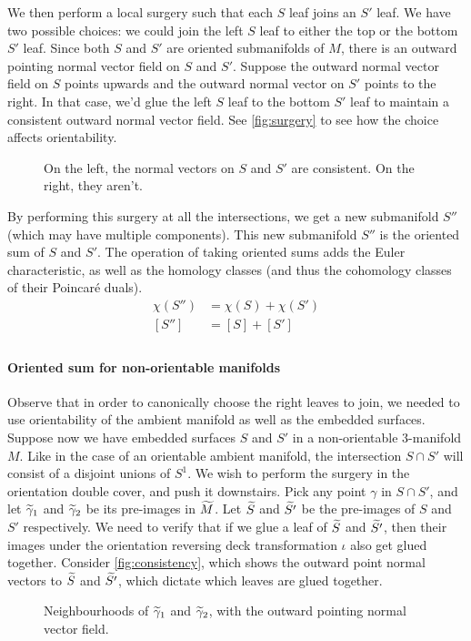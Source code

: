 We then perform a local surgery such that each $S$ leaf joins an $S'$ leaf. We have two possible choices: we
could join the left $S$ leaf to either the top or the bottom $S'$ leaf. Since both $S$ and $S'$ are oriented
submanifolds of $M$, there is an outward pointing normal vector field on $S$ and $S'$. Suppose the outward
normal vector field on $S$ points upwards and the outward normal vector on $S'$ points to the right. In that
case, we'd glue the left $S$ leaf to the bottom $S'$ leaf to maintain a consistent outward normal vector
field. See \autoref{fig:surgery} to see how the choice affects orientability.
\begin{figure}[h]
  \centering
  \caption{On the left, the normal vectors on $S$ and $S'$ are consistent. On the right, they aren't.}
  \label{fig:surgery}
\end{figure}

By performing this surgery at all the intersections, we get a new submanifold $S''$ (which may have
multiple components). This new submanifold $S''$ is the oriented sum of $S$ and $S'$. The operation of
taking oriented sums adds the Euler characteristic, as well as the homology classes (and thus the cohomology
classes of their Poincar\'e duals).
\begin{align*}
  \chi(S'') &= \chi(S) + \chi(S') \\
  [S''] &= [S] + [S'] \\
\end{align*}

\paragraph{Oriented sum for non-orientable manifolds}
Observe that in order to canonically choose the right leaves to join, we needed to use orientability of the
ambient manifold as well as the embedded surfaces. Suppose now we have embedded surfaces $S$ and $S'$ in a
non-orientable $3$-manifold $M$. Like in the case of an orientable ambient manifold, the intersection
$S \cap S'$ will consist of a disjoint unions of $S^1$. We wish to perform the surgery in the orientation
double cover, and push it downstairs. Pick any point $\gamma$ in $S \cap S'$, and let $\widetilde{\gamma}_1$ and
$\widetilde{\gamma}_2$ be its pre-images in $\widetilde{M}$. Let $\widetilde{S}$ and $\widetilde{S'}$ be the pre-images of $S$ and $S'$
respectively. We need to verify that if we glue a leaf of $\widetilde{S}$ and $\widetilde{S'}$, then their images under
the orientation reversing deck transformation $\iota$ also get glued together. Consider \autoref{fig:consistency},
which shows the outward point normal vectors to $\widetilde{S}$ and $\widetilde{S'}$, which dictate which leaves are glued
together.
\begin{figure}[h]
  \centering
  \caption{Neighbourhoods of $\widetilde{\gamma}_1$ and $\widetilde{\gamma}_2$, with the outward pointing normal vector field.}
  \label{fig:consistency}
\end{figure}

